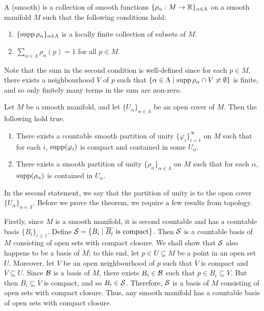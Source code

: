 \begin{definition}
    A (smooth)  is a collection of smooth functions $\{\rho_{\alpha}:M \to \mathbb{R}\}_{\alpha \in \Lambda}$ on a smooth manifold $M$ such that the following conditions hold:
    \begin{enumerate}
        \item $\{\operatorname{supp}{\rho_{\alpha}}\}_{\alpha \in \Lambda}$ is a locally finite collection of subsets of $M$.
        \item $\sum_{\alpha \in \Lambda} \rho_{\alpha}(p) = 1$ for all $p \in M$.
    \end{enumerate}
\end{definition}
Note that the sum in the second condition is well-defined since for each $p \in M$, there exists a neighbourhood $V$ of $p$ such that $\{\alpha \in \Lambda \mid \operatorname{supp}{\rho_{\alpha}} \cap V \neq \emptyset\}$ is finite, and so only finitely many terms in the sum are non-zero.

\begin{theorem}
    Let $M$ be a smooth manifold, and let $\{U_{\alpha}\}_{\alpha \in \Lambda}$ be an open cover of $M$. Then the following hold true.
    \begin{enumerate}
        \item There exists a countable smooth partition of unity $\{\varphi_{i}\}_{i=1}^{\infty}$ on $M$ such that for each $i$, $\operatorname{supp}(\varphi_{i})$ is compact and contained in some $U_{\alpha}$.
        \item There exists a smooth partition of unity $\{\rho_{\alpha}\}_{\alpha \in \Lambda}$ on $M$ such that for each $\alpha$, $\operatorname{supp}(\rho_{\alpha})$ is contained in $U_{\alpha}$. 
    \end{enumerate}
\end{theorem}
In the second statement, we say that the partition of unity is  to the open cover $\{U_{\alpha}\}_{\alpha \in \Lambda}$. Before we prove the theorem, we require a few results from topology.

Firstly, since $M$ is a smooth manifold, it is second countable and has a countable basis $\{B_{i}\}_{i \geq 1}$. Define $\mathcal{S} = \{B_{i} \mid \overline{B_{i}} \text{ is compact}\}$. Then $\mathcal{S}$ is a countable basis of $M$ consisting of open sets with compact closure. We shall show that $\mathcal{S}$ also happens to be a basis of $M$; to this end, let $p \in U \subseteq M$ be a point in an open set $U$. Moreover, let $V$ be an open neighbourhood of $p$ such that $\overline{V}$ is compact and $\overline{V} \subseteq U$. Since $\mathcal{B}$ is a basis of $M$, there exists $B_{i} \in \mathcal{B}$ such that $p \in B_{i} \subseteq V$. But then $\overline{B_{i}} \subseteq \overline{V}$ is compact, and so $B_{i} \in \mathcal{S}$. Therefore, $\mathcal{S}$ is a basis of $M$ consisting of open sets with compact closure. Thus, any smooth manifold has a countable basis of open sets with compact closure.

